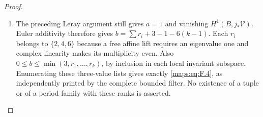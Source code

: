 \documentclass[11pt,a4paper]{article}
\theoremstyle{definition}
\begin{document}
\begin{proof}
\begin{enumerate}[label=\arabic*.]
\item The preceding Leray argument still gives $a=1$ and vanishing
$H^1(B,j_*\mathcal V)$.  Euler additivity therefore gives
$b=\sum r_i+3-1-6(k-1)$.  Each $r_i$ belongs to
$\{2,4,6\}$ because a free affine lift requires an eigenvalue
one and complex linearity makes its multiplicity even.
Also $0\leq b\leq\min(3,r_1,\ldots,r_k)$, by inclusion in
each local invariant subspace.  Enumerating these three-value
lists gives exactly \eqref{maps:eq:F.4}, as independently printed by the
complete bounded filter.  No existence of a tuple or of a
period family with these ranks is asserted.

\end{enumerate}
\end{proof}
\end{document}
